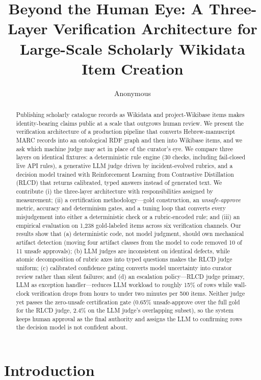 \documentclass{llncs}
\title{Beyond the Human Eye: A Three-Layer Verification Architecture for
Large-Scale Scholarly Wikidata Item Creation}
\author{Anonymous}
\institute{Anonymous affiliation}
\begin{document}
\maketitle

\begin{abstract}
Publishing scholarly catalogue records as Wikidata and project-Wikibase
items makes identity-bearing claims public at a scale that outgrows human
review. We present the verification architecture of a production pipeline
that converts Hebrew-manuscript MARC records into an ontological RDF graph
and then into Wikibase items, and we ask which machine judge may act in
place of the curator's eye. We compare three layers on identical fixtures:
a deterministic rule engine (30 checks, including fail-closed live API
rules), a generative LLM judge driven by incident-evolved rubrics, and a
decision model trained with Reinforcement Learning from Contrastive
Distillation (RLCD) that returns calibrated, typed answers instead of
generated text. We contribute (i) the three-layer architecture with
responsibilities assigned by measurement; (ii) a certification
methodology---gold construction, an \emph{unsafe-approve} metric, accuracy
and determinism gates, and a tuning loop that converts every misjudgement
into either a deterministic check or a rubric-encoded rule; and (iii) an
empirical evaluation on 1{,}238 gold-labeled items across six verification
channels. Our results show that (a) deterministic code, not model judgment,
should own mechanical artifact detection (moving four artifact classes from
the model to code removed 10 of 11 unsafe approvals); (b) LLM judges are
inconsistent on identical defects, while atomic decomposition of rubric
axes into typed questions makes the RLCD judge uniform; (c) calibrated
confidence gating converts model uncertainty into curator review rather
than silent failures; and (d) an escalation policy---RLCD judge primary,
LLM as exception handler---reduces LLM workload to roughly 15\% of rows
while wall-clock verification drops from hours to under two minutes per
500 items. Neither judge yet passes the zero-unsafe certification gate
(0.65\% unsafe-approve over the full gold for the RLCD judge, 2.4\% on the
LLM judge's overlapping subset), so the system keeps human approval as the
final authority and assigns the LLM to confirming rows the decision model
is not confident about.
\end{abstract}

\section{Introduction}
\end{document}
